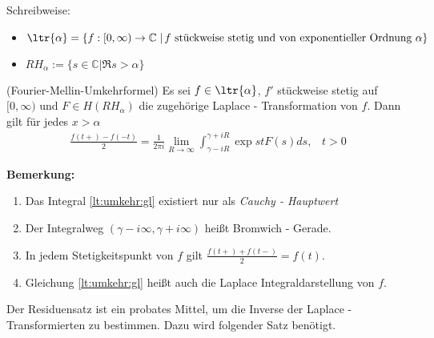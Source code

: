 \cite{Lauf2006}
Schreibweise:
\begin{itemize}
\item $\ltr{\alpha}= \{f:[0, \infty) \rightarrow \mathbb{C} \left. \right| f \text{ stückweise stetig und von exponentieller\label{a:L_stetig} Ordnung } \alpha\}$
\item $RH_{\alpha}:= \{ s \in \mathbb{C} \left. \right| \Re{s} > \alpha\}$
\end{itemize}
\begin{satz}\label{lt:umkehr}(Fourier-Mellin-Umkehrformel)
Es sei $f \in \ltr{\alpha}$, $f'$ stückweise stetig auf $[0, \infty)$ und $F \in H(RH_{\alpha})$ die zugehörige Laplace - Transformation von $f$. Dann gilt für jedes $x > \alpha$
\begin{align}
	\frac{f(t+) - f(-t)}{2} = \frac{1}{2 \pi i } \lim_{R \rightarrow \infty} \int_{\gamma - i R}^{\gamma+ i R} \exp{st} F(s) ds \text{,} \quad t > 0 \label{lt:umkehr:gl}
\end{align}
\end{satz}
\textbf{Bemerkung:}
\begin{enumerate}
\item Das Integral \ref{lt:umkehr:gl} existiert nur als \textit{Cauchy - Hauptwert}
\item Der Integralweg $(\gamma - i \infty, \gamma + i \infty)$ heißt Bromwich - Gerade.
\item In jedem Stetigkeitspunkt von $f$ gilt $\frac{f(t+)+f(t-)}{2} = f(t)$.
\item Gleichung \ref{lt:umkehr:gl} heißt auch die Laplace Integraldarstellung von $f$.
\end{enumerate}
Der Residuensatz ist ein probates Mittel, um die Inverse der Laplace - Transformierten zu bestimmen. Dazu wird folgender Satz benötigt.\cite{Lauf2006}\\



